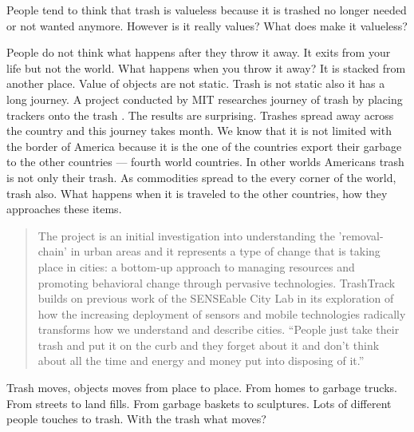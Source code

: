 People tend to think that trash is valueless because it is trashed no longer needed or not wanted anymore. However is it really values? What does make it valueless? 

People do not think what happens after they throw it away. It exits from your life but not the world. What happens when you throw it away? It is stacked from another place. Value of objects are not static. Trash is not static  also it has a long journey. A project conducted by MIT researches journey of trash by placing trackers onto the trash \cite{chen2009mit}. The results are surprising. Trashes spread away across the country and this journey takes month.  We know that it is not limited with the border of America because it is the one of the countries export their garbage to the other countries --- fourth world countries. In other worlds Americans trash is not only their trash. As commodities spread to the every corner of the world, trash also. What happens when it is traveled to the other countries, how they approaches these items.  

\begin{quote}
 The project is an initial investigation into understanding the 'removal-chain' in urban areas and it represents a type of change that is taking place in cities: a bottom-up approach to managing resources and promoting behavioral change through pervasive technologies. TrashTrack builds on previous work of the SENSEable City Lab in its exploration of how the increasing deployment of sensors and mobile technologies radically transforms how we understand and describe cities. “People just take their trash and put it on the curb and they forget about it and don’t think about all the time and energy and money put into disposing of it.”
\end{quote}

Trash moves, objects moves from place to place. From homes to garbage trucks. From streets to land fills. From garbage baskets to sculptures.  Lots of different people touches to trash. With the trash what moves?

